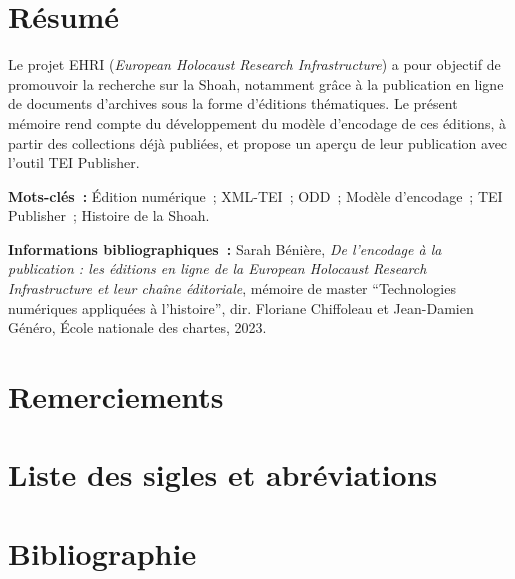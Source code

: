 \documentclass[a4paper, 12pt, twoside]{book}
\begin{document}
    \thispagestyle{empty}
    \cleardoublepage

    \frontmatter
    \chapter{Résumé}
    \medskip
    Le projet EHRI (\textit{European Holocaust Research Infrastructure}) a pour objectif de promouvoir la recherche sur la Shoah, notamment grâce à la publication en ligne de documents d'archives sous la forme d'éditions thématiques. Le présent mémoire rend compte du développement du modèle d'encodage de ces éditions, à partir des collections déjà publiées, et propose un aperçu de leur publication avec l'outil TEI Publisher.

    \bigskip
    \textbf{Mots-clés~:} Édition numérique~; XML-TEI~; ODD~; Modèle d'encodage~; TEI Publisher~; Histoire de la Shoah.

    \bigskip
    \textbf{Informations bibliographiques~:} Sarah Bénière, \textit{De l'encodage à la publication : les éditions en ligne de la European Holocaust Research Infrastructure et leur chaîne éditoriale}, mémoire de master \enquote{Technologies numériques appliquées à l'histoire}, dir. Floriane Chiffoleau et Jean-Damien Généro, École nationale des chartes, 2023.

    \newpage{\pagestyle{empty}\cleardoublepage}

    \chapter{Remerciements}
    

    \chapter{Liste des sigles et abréviations}
    


    \chapter{Bibliographie}
    \printbibliography[heading=subbibliography, keyword={edition}, title={Généralités sur l'édition de textes}]
    \printbibliography[heading=subbibliography, keyword={ednum}, title={Pratique de l'édition numérique}]
    \printbibliography[heading=subbibliography, keyword={publication}, title={Publication électronique}]
    \printbibliography[heading=subbibliography, keyword={xml}, title={Environnement XML et standard TEI}]
    \printbibliography[heading=subbibliography, keyword={archivistique}, title={Archivistique et diplomatique}]
    \printbibliography[heading=subbibliography, keyword={shoah}, title={Histoire de la Shoah}]
    \printbibliography[heading=subbibliography, keyword={webographie}, title={Webographie}]
\end{document}
